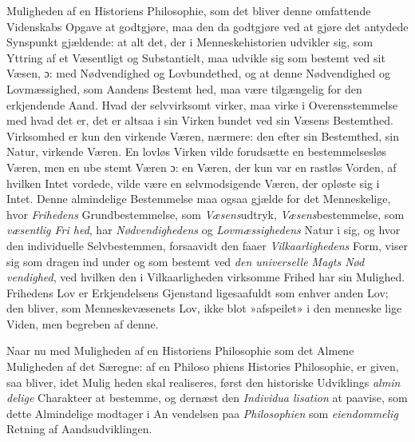 Muligheden af en Historiens Philosophie, som det bliver
denne omfattende Videnskabs Opgave at godtgjøre, maa den
da godtgjøre ved at gjøre det antydede Synspunkt gjældende:
at alt det, der i Menneskehistorien udvikler sig, som Yttring
af et Væsentligt og Substantielt, maa udvikle sig som bestemt
ved sit Væsen, ɔ: med Nødvendighed og Lovbundethed, og at
denne Nødvendighed og Lovmæssighed, som Aandens Bestemt\-%
hed, maa være tilgængelig for den erkjendende Aand. Hvad
der selvvirksomt virker, maa virke i Overensstemmelse med
hvad det er, det er altsaa i sin Virken bundet ved sin Væsens
Bestemthed. Virksomhed er kun den virkende Væren, nærmere:
den efter sin Bestemthed, sin Natur, virkende Væren. En lovløs
Virken vilde forudsætte en bestemmelsesløs Væren, men en ube\-%
stemt Væren ɔ: en Væren, der kun var en rastløs Vorden, af hvilken
Intet vordede, vilde være en selvmodsigende Væren, der opløste sig
i Intet. Denne almindelige Bestemmelse maa ogsaa gjælde for
det Menneskelige, hvor \emph{Frihedens} Grundbestemmelse, som
\emph{Væsens}udtryk, \emph{Væsens}bestemmelse, som \emph{væsentlig Fri\-%
hed}, har \emph{Nødvendighedens} og \emph{Lovmæssighedens} Natur
i sig, og hvor den individuelle Selvbestemmen, forsaavidt den
faaer \emph{Vilkaarlighedens} Form, viser sig som dragen ind
under og som bestemt ved \emph{den universelle Magts Nød\-%
vendighed}, ved hvilken den i Vilkaarligheden virksomme
Frihed har sin Mulighed. Frihedens Lov er Erkjendelsens
Gjenstand ligesaafuldt som enhver anden Lov; den bliver, som
Menneskevæsenets Lov, ikke blot »afspeilet» i den menneske\-%
lige Viden, men begreben af denne.

Naar nu med Muligheden af en Historiens Philosophie
som det Almene Muligheden af det Særegne: af en Philoso\-%
phiens Histories Philosophie, er given, saa bliver, idet Mulig\-%
heden skal realiseres, først den historiske Udviklings \emph{almin\-%
delige} Charakteer at bestemme, og dernæst den \emph{Individua\-%
lisation} at paavise, som dette Almindelige modtager i An\-%
vendelsen paa \emph{Philosophien} som \emph{eiendommelig} Retning
af Aandsudviklingen.

